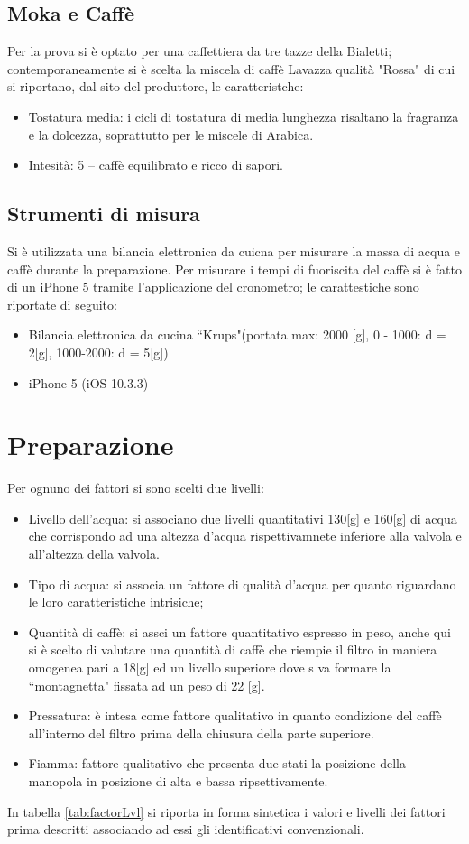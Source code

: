 \subsection{Moka e Caffè}
Per la prova si è optato per una caffettiera da tre tazze della Bialetti; contemporaneamente si è scelta la miscela di caffè Lavazza qualità "Rossa" di cui si riportano, dal sito del produttore\cite{Lavazza_2017}, le caratteristche:
\begin{itemize}
  \item Tostatura media: i cicli di tostatura di media lunghezza risaltano la fragranza e la dolcezza, soprattutto per le miscele di Arabica.
  \item Intesità: 5 -- caffè equilibrato e ricco di sapori.
\end{itemize}
\subsection{Strumenti di misura}
Si è utilizzata una bilancia elettronica da cuicna per misurare la massa di acqua e caffè durante la preparazione.
Per misurare i tempi di fuoriscita del caffè si è fatto di un iPhone 5 tramite l'applicazione del cronometro; le carattestiche sono riportate di seguito:
\begin{itemize}
  \item Bilancia elettronica da cucina “Krups"(portata max: 2000 [g], 0 - 1000: d = 2[g], 1000-2000: d = 5[g])
  \item iPhone 5 (iOS 10.3.3)
\end{itemize}


\section{Preparazione}
Per ognuno dei fattori si sono scelti due livelli:
\begin{itemize}
  \item Livello dell'acqua: si associano due livelli quantitativi 130[g] e 160[g] di acqua che corrispondo ad una altezza d'acqua rispettivamnete inferiore alla valvola e all'altezza della valvola.
  \item Tipo di acqua: si associa un fattore di qualità d'acqua per quanto riguardano le loro caratteristiche intrisiche;
  \item Quantità di caffè: si assci un fattore quantitativo espresso in peso, anche qui si è scelto di valutare una quantità di caffè che riempie il filtro in maniera omogenea pari a 18[g] ed un livello superiore dove s va formare la “montagnetta" fissata ad un peso di 22 [g].
  \item Pressatura: è intesa come fattore qualitativo in quanto condizione del caffè all'interno del filtro prima della chiusura della parte superiore.
  \item Fiamma: fattore qualitativo che presenta due stati la posizione della manopola in posizione di alta e bassa ripsettivamente.
\end{itemize}
In tabella \ref{tab:factorLvl} si riporta in forma sintetica i valori e livelli dei fattori prima descritti associando ad essi gli identificativi convenzionali.

